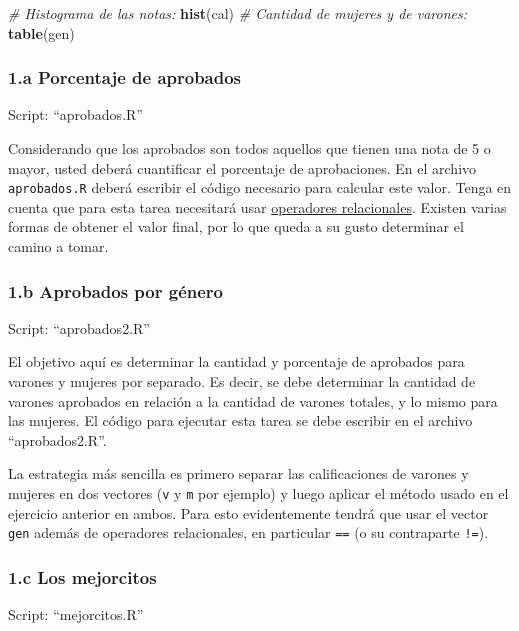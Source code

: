 \documentclass[]{article}
\newenvironment{Shaded}{}{}
\newcommand{\KeywordTok}[1]{\textcolor[rgb]{0.00,0.44,0.13}{\textbf{{#1}}}}
\newcommand{\CommentTok}[1]{\textcolor[rgb]{0.38,0.63,0.69}{\textit{{#1}}}}
\newcommand{\NormalTok}[1]{{#1}}
\begin{document}
\begin{Shaded}
\begin{Highlighting}[]
\CommentTok{# Histograma de las notas:}
\KeywordTok{hist}\NormalTok{(cal)}
\CommentTok{# Cantidad de mujeres y de varones:}
\KeywordTok{table}\NormalTok{(gen)}
\end{Highlighting}
\end{Shaded}
\subsubsection{1.a Porcentaje de aprobados}

Script: ``aprobados.R''

Considerando que los aprobados son todos aquellos que tienen una nota de
5 o mayor, usted deberá cuantificar el porcentaje de aprobaciones. En el
archivo \texttt{aprobados.R} deberá escribir el código necesario para
calcular este valor. Tenga en cuenta que para esta tarea necesitará usar
\href{http://eva.universidad.edu.uy/mod/resource/view.php?id=94745}{operadores
relacionales}. Existen varias formas de obtener el valor final, por lo
que queda a su gusto determinar el camino a tomar.

\subsubsection{1.b Aprobados por género}

Script: ``aprobados2.R''

El objetivo aquí es determinar la cantidad y porcentaje de aprobados
para varones y mujeres por separado. Es decir, se debe determinar la
cantidad de varones aprobados en relación a la cantidad de varones
totales, y lo mismo para las mujeres. El código para ejecutar esta tarea
se debe escribir en el archivo ``aprobados2.R''.

La estrategia más sencilla es primero separar las calificaciones de
varones y mujeres en dos vectores (\texttt{v} y \texttt{m} por ejemplo)
y luego aplicar el método usado en el ejercicio anterior en ambos. Para
esto evidentemente tendrá que usar el vector \texttt{gen} además de
operadores relacionales, en particular \texttt{==} (o su contraparte
\texttt{!=}).

\subsubsection{1.c Los mejorcitos}

Script: ``mejorcitos.R''
\end{document}
